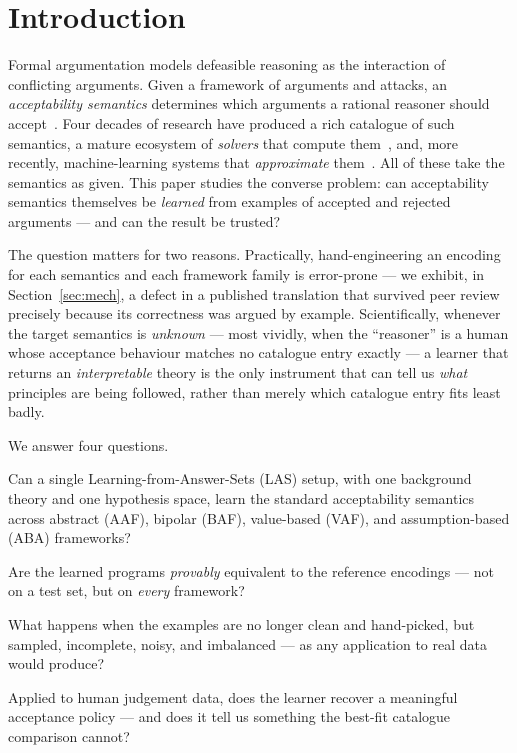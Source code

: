 \documentclass[review,12pt]{elsarticle}
\theoremstyle{definition}
\theoremstyle{remark}
\begin{document}
\linenumbers

\section{Introduction}
\label{sec:intro}

Formal argumentation models defeasible reasoning as the interaction of
conflicting arguments. Given a framework of arguments and attacks, an
\emph{acceptability semantics} determines which arguments a rational reasoner
should accept~\citep{dung1995}. Four decades of research have produced a rich
catalogue of such semantics, a mature ecosystem of \emph{solvers} that compute
them~\citep{egly2010,iccma23}, and, more recently, machine-learning systems
that \emph{approximate} them~\citep{craandijkbex2020}. All of these take the
semantics as given. This paper studies the converse problem: can acceptability
semantics themselves be \emph{learned} from examples of accepted and rejected
arguments --- and can the result be trusted?

The question matters for two reasons. Practically, hand-engineering an encoding
for each semantics and each framework family is error-prone --- we exhibit, in
Section~\ref{sec:mech}, a defect in a published translation that survived peer
review precisely because its correctness was argued by example. Scientifically,
whenever the target semantics is \emph{unknown} --- most vividly, when the
``reasoner'' is a human whose acceptance behaviour matches no catalogue entry
exactly --- a learner that returns an \emph{interpretable} theory is the only
instrument that can tell us \emph{what} principles are being followed, rather
than merely which catalogue entry fits least badly.

We answer four questions.

\begin{description}[leftmargin=1.6em,itemsep=2pt]
\item[Q1 (Learnable?)] Can a single Learning-from-Answer-Sets (LAS) setup, with
one background theory and one hypothesis space, learn the standard acceptability
semantics across abstract (AAF), bipolar (BAF), value-based (VAF), and
assumption-based (ABA) frameworks?
\item[Q2 (Correct?)] Are the learned programs \emph{provably} equivalent to the
reference encodings --- not on a test set, but on \emph{every} framework?
\item[Q3 (Robust?)] What happens when the examples are no longer clean and
hand-picked, but sampled, incomplete, noisy, and imbalanced --- as any
application to real data would produce?
\item[Q4 (Useful when the target is unknown?)] Applied to human judgement data,
does the learner recover a meaningful acceptance policy --- and does it tell us
something the best-fit catalogue comparison cannot?
\end{description}
\end{document}
